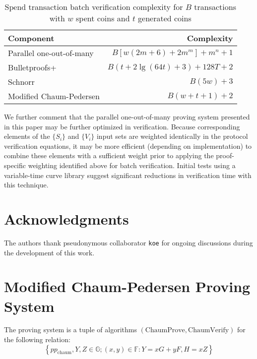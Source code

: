 \documentclass{llncs}
\newcommand{\G}{\mathbb{G}}
\newcommand{\F}{\mathbb{F}}
\begin{document}
\begin{table}
    \caption{$\text{Spend}$ transaction batch verification complexity for $B$ transactions with $w$ spent coins and $t$ generated coins}
    \label{table:time}
    \centering
    \begin{tabular}{|l|r|}
        \hline
        \textbf{Component} & \textbf{Complexity} \\
        \hline
        Parallel one-out-of-many & $B[w(2m + 6) + 2m^m] + m^n + 1$ \\
        Bulletproofs+ & $B(t + 2\lg(64t) + 3) + 128T + 2$ \\
        Schnorr & $B(5w) + 3$ \\
        Modified Chaum-Pedersen & $B(w + t + 1) + 2$ \\
        \hline
    \end{tabular}
\end{table}

We further comment that the parallel one-out-of-many proving system presented in this paper may be further optimized in verification.
Because corresponding elements of the $\{S_i\}$ and $\{V_i\}$ input sets are weighted identically in the protocol verification equations, it may be more efficient (depending on implementation) to combine these elements with a sufficient weight prior to applying the proof-specific weighting identified above for batch verification.
Initial tests using a variable-time curve library suggest significant reductions in verification time with this technique.


\section*{Acknowledgments}

The authors thank pseudonymous collaborator \texttt{koe} for ongoing discussions during the development of this work.





\appendix


\section{Modified Chaum-Pedersen Proving System}
\label{app:chaum}

The proving system is a tuple of algorithms $(\text{ChaumProve},\text{ChaumVerify})$ for the following relation:
$$\left\{ pp_{\text{chaum}}, Y, Z \in \G ; (x, y) \in \F : Y = xG + yF, H = xZ \right\}$$
\end{document}
